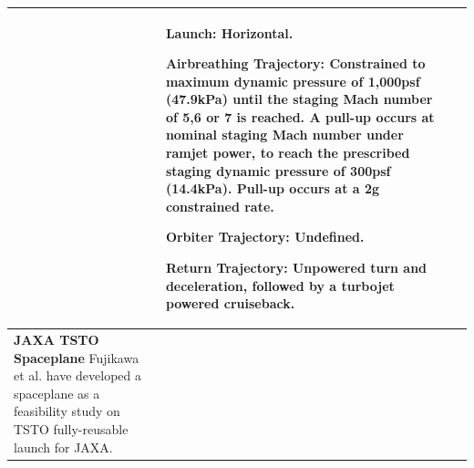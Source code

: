 {\begin{landscape}
\begin{xltabular}{\linewidth}{|X|X|X|}
	
	&\small
	
	\textbf{Launch:} Horizontal.
	
	\textbf{Airbreathing Trajectory:} Constrained to maximum dynamic pressure of 1,000psf (47.9kPa) until the staging Mach number of 5,6 or 7 is reached. A pull-up occurs at nominal staging Mach number under ramjet power, to reach the prescribed staging dynamic pressure of 300psf (14.4kPa). Pull-up occurs at a 2g constrained rate. 
	
	\textbf{Orbiter Trajectory:} Undefined.
	
	\textbf{Return Trajectory:} Unpowered turn and deceleration, followed by a turbojet powered cruiseback. 
	\\
	
	
	\hline \small 
	\textbf{JAXA TSTO Spaceplane}\cite{Fujikawa2017}\newline\newline
	Fujikawa et al.\cite{Fujikawa2017} have developed a spaceplane as a feasibility study on TSTO fully-reusable launch for JAXA. 
	
	&\small
	

\end{xltabular}
\end{landscape}}
